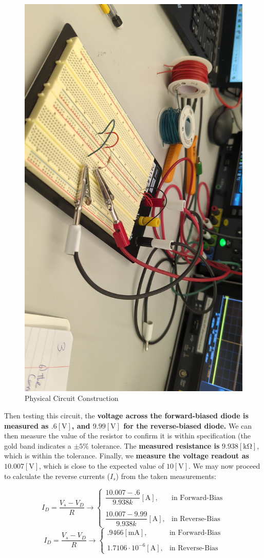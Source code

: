 \documentclass[
	letterpaper, %
	10pt, %
]{CSUniSchoolLabReport}
\begin{document}
\begin{figure}[H]
  \centering
  \includegraphics[width=.75\textwidth]{Figures/L2F2}
  \caption{Physical Circuit Construction}
  \label{fig:2}
\end{figure}

Then testing this circuit, the \textbf{voltage across the forward-biased diode is measured as $.6[\si{\volt}]$, and $9.99[\si{\volt}]$ for the reverse-biased diode.} We can then measure the value of the resistor to confirm it is within specification (the gold band indicates a $\pm5\%$ tolerance. The \textbf{measured resistance is} $9.938[\si{\kilo\ohm}]$, which is within the tolerance. Finally, we \textbf{measure the voltage readout as} $10.007[\si{\volt}]$, which is close to the expected value of $10[\si{\volt}]$. We may now proceed to calculate the reverse currents ($I_s$) from the taken measurements:

  $$I_D=\dfrac{V_s-V_D}{R}\to\left\{\begin{array}{ll} \dfrac{10.007-.6}{9.938k}[\si{\ampere}], &\text{in Forward-Bias}\\\\ \dfrac{10.007-9.99}{9.938k}[\si{\ampere}], &\text{in Reverse-Bias}\end{array}$$
  $$\boxed{I_D=\dfrac{V_s-V_D}{R}\to\left\{\begin{array}{ll}.9466[\si{\milli\ampere}], &\text{in Forward-Bias}\\\\ 1.7106\cdot10^{-6}[\si{\ampere}], &\text{in Reverse-Bias}\end{array}}$$
\end{document}
